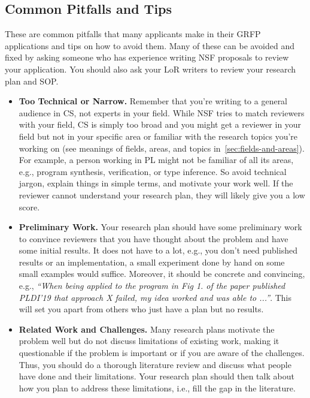 \documentclass[oneside,11pt]{book}
\begin{document}
\subsection{Common Pitfalls and Tips}\label{sec:grfp-pitfalls}

These are common pitfalls that many applicants make in their GRFP applications and tips on how to avoid them. Many of these can be avoided and fixed by asking someone who has experience writing NSF proposals to review your application.  You should also ask your LoR writers to review your research plan and SOP.  


\begin{itemize}

\item \textbf{Too Technical or Narrow.} Remember that you're writing to a general audience in CS, not experts in your field.  While NSF tries to match reviewers with your field, CS is simply too broad and you might get a reviewer in your field but not in your specific area or familiar with the research topics you're working on (see meanings of fields, areas, and topics in~\autoref{sec:fields-and-areas}).  For example, a person working in PL might not be familiar of all its areas, e.g., program synthesis, verification, or type inference.  
So avoid technical jargon, explain things in simple terms, and motivate your work well. If the reviewer cannot understand your research plan, they will likely give you a low score.


\item \textbf{Preliminary Work.} Your research plan should have some preliminary work to convince reviewers that you have thought about the problem and have some initial results.  It does not have to a lot, e.g., you don't need published results or an implementation, a small experiment done by hand on some small examples would suffice.  Moreover, it should be concrete and convincing, e.g., \emph{``When being applied to the program in Fig 1. of the paper published PLDI'19 that approach X failed, my idea worked and was able to ...''}.  This will set you apart from others who just have a plan but no results.

\item \textbf{Related Work and Challenges.} Many research plans motivate the problem well but do not discuss limitations of existing work, making it questionable if the problem is important or if you are aware of the challenges.  Thus, you should do a thorough literature review and discuss what people have done and their limitations.  Your research plan should then talk about how you plan to address these limitations, i.e., fill the gap in the literature.  


\end{itemize}
\end{document}
